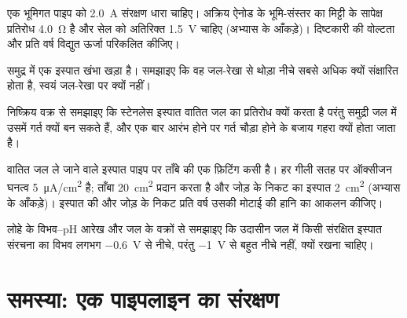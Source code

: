 \begin{exercise}[$\star\star$]\label{exo:b2:corrosion:8}
एक भूमिगत पाइप को \qty{2.0}{A} संरक्षण धारा चाहिए। अक्रिय ऐनोड के भूमि-संस्तर
का मिट्टी के सापेक्ष प्रतिरोध \qty{4.0}{\ohm} है और सेल को अतिरिक्त
\qty{1.5}{V} चाहिए (अभ्यास के आँकड़े)। दिष्टकारी की वोल्टता और प्रति वर्ष
विद्युत ऊर्जा परिकलित कीजिए।
\end{exercise}

\begin{exercise}[$\star\star$]\label{exo:b2:corrosion:9}
समुद्र में एक इस्पात खंभा खड़ा है। समझाइए कि वह जल-रेखा से थोड़ा नीचे
सबसे अधिक क्यों संक्षारित होता है, स्वयं जल-रेखा पर क्यों नहीं।
\end{exercise}

\begin{exercise}[$\star\star\star$]\label{exo:b2:corrosion:10}
निष्क्रिय वक्र से समझाइए कि स्टेनलेस इस्पात वातित जल का प्रतिरोध क्यों करता है परंतु
समुद्री जल में उसमें गर्त क्यों बन सकते हैं, और एक बार आरंभ होने पर गर्त चौड़ा होने के बजाय
गहरा क्यों होता जाता है।
\end{exercise}

\begin{exercise}[$\star\star\star$]\label{exo:b2:corrosion:11}
वातित जल ले जाने वाले इस्पात पाइप पर ताँबे की एक फ़िटिंग कसी है। हर गीली सतह पर
ऑक्सीजन  घनत्व \qty{5}{\micro A/cm^2} है; ताँबा
\qty{20}{cm^2} प्रदान करता है और जोड़ के निकट का इस्पात \qty{2}{cm^2}
(अभ्यास के आँकड़े)। इस्पात की  और जोड़ के निकट प्रति वर्ष उसकी
मोटाई की हानि का आकलन कीजिए।
\end{exercise}

\begin{exercise}[$\star\star\star$]\label{exo:b2:corrosion:12}
लोहे के विभव--pH आरेख और जल के वक्रों से समझाइए कि उदासीन जल में किसी संरक्षित
इस्पात संरचना का विभव लगभग \qty{-0.6}{V} से नीचे, परंतु \qty{-1}{V} से बहुत नीचे नहीं,
क्यों रखना चाहिए।
\end{exercise}

\section{समस्या: एक पाइपलाइन का संरक्षण}

